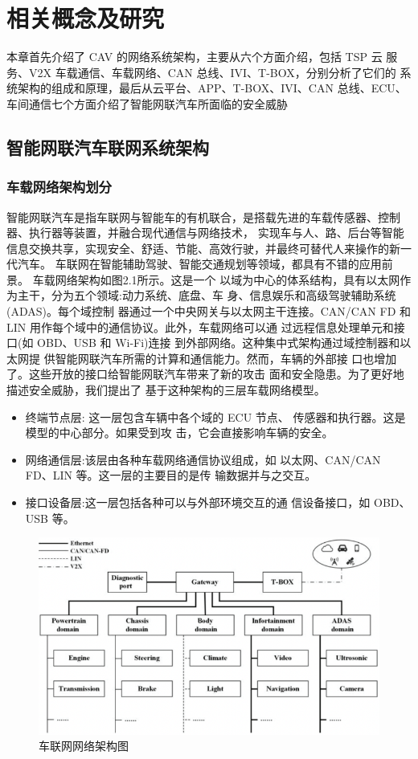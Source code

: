 \chapter{相关概念及研究}
\label{ch2}

本章首先介绍了 CAV 的网络系统架构，主要从六个方面介绍，包括 TSP 云
服务、V2X 车载通信、车载网络、CAN 总线、IVI、T-BOX，分别分析了它们的
系统架构的组成和原理，最后从云平台、APP、T-BOX、IVI、CAN 总线、ECU、
车间通信七个方面介绍了智能网联汽车所面临的安全威胁

\section{智能网联汽车联网系统架构}

\subsection{车载网络架构划分}
智能网联汽车是指车联网与智能车的有机联合，是搭载先进的车载传感器、控制器、执行器等装置，并融合现代通信与网络技术，
实现车与人、路、后台等智能信息交换共享，实现安全、舒适、节能、高效行驶，并最终可替代人来操作的新一代汽车\cite{icvsintro}。
车联网在智能辅助驾驶、智能交通规划等领域，都具有不错的应用前景。
车载网络架构如图2.1所示。这是一个
以域为中心的体系结构，具有以太网作为主干，分为五个领域:动力系统、底盘、车
身、信息娱乐和高级驾驶辅助系统(ADAS)。每个域控制
器通过一个中央网关与以太网主干连接。CAN/CAN FD 和
LIN 用作每个域中的通信协议。此外，车载网络可以通
过远程信息处理单元和接口(如 OBD、USB 和 Wi-Fi)连接
到外部网络。这种集中式架构通过域控制器和以太网提
供智能网联汽车所需的计算和通信能力。然而，车辆的外部接
口也增加了。这些开放的接口给智能网联汽车带来了新的攻击
面和安全隐患。为了更好地描述安全威胁，我们提出了
基于这种架构的三层车载网络模型。
\begin{itemize}
    \item 终端节点层: 这一层包含车辆中各个域的 ECU 节点、
    传感器和执行器。这是模型的中心部分。如果受到攻
    击，它会直接影响车辆的安全。
    \item 网络通信层:该层由各种车载网络通信协议组成，如
    以太网、CAN/CAN FD、LIN 等。这一层的主要目的是传
    输数据并与之交互。
    \item 接口设备层:这一层包括各种可以与外部环境交互的通
    信设备接口，如 OBD、USB 等。
\end{itemize}
\begin{figure}
  \centering
  \includegraphics[scale=0.6]{resources/img/i1.png}
  \caption{车联网网络架构图}
\end{figure}
